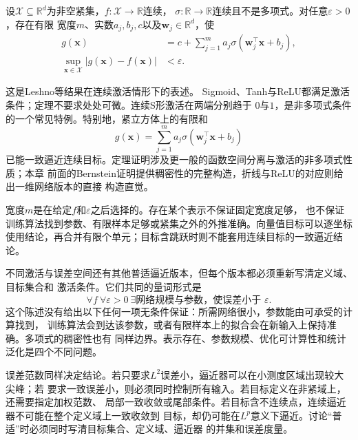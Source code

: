 \begin{theorem}[单隐藏层的通用逼近]
\label{thm:functional-universal-approximation}
设$\mathcal X\subseteq\mathbb R^d$为非空紧集，$f:\mathcal X\to\mathbb R$连续，
$\sigma:\mathbb R\to\mathbb R$连续且不是多项式。对任意$\varepsilon>0$，存在有限
宽度$m$、实数$a_j,b_j,c$以及$\bm w_j\in\mathbb R^d$，使
\begin{equation}
 \begin{aligned}
 g(\bm x)&=c+\sum_{j=1}^m a_j\sigma(\bm w_j^{\top}\bm x+b_j),\\
 \sup_{\bm x\in\mathcal X}|g(\bm x)-f(\bm x)|&<\varepsilon.
 \end{aligned}
 \label{eq:functional-universal-approximation}
\end{equation}
\end{theorem}

这是Leshno等结果在连续激活情形下的表述。
Sigmoid、Tanh与ReLU都满足激活条件；定理不要求处处可微。连续S形激活在两端分别趋于
$0$与$1$，是非多项式条件的一个常见特例。特别地，紧立方体上的有限和
\begin{equation}
 g(\bm x)=\sum_{j=1}^m a_j\sigma(\bm w_j^{\top}\bm x+b_j)
 \label{eq:functional-sigmoidal-network}
\end{equation}
已能一致逼近连续目标。定理证明涉及更一般的函数空间分离与激活的非多项式性质；本章
前面的Bernstein证明提供稠密性的完整构造，折线与ReLU的对应则给出一维网络版本的直接
构造直觉。

宽度$m$是在给定$f$和$\varepsilon$之后选择的。存在某个表示不保证固定宽度足够，
也不保证训练算法找到参数、有限样本足够或紧集之外的外推准确。向量值目标可以逐坐标
使用结论，再合并有限个单元；目标含跳跃时则不能套用连续目标的一致逼近结论。

不同激活与误差空间还有其他普适逼近版本，但每个版本都必须重新写清定义域、目标集合和
激活条件。它们共同的量词形式是
\[
  \forall f\ \forall\varepsilon>0\
  \exists\text{网络规模与参数，使误差小于 }\varepsilon.
\]
这个陈述没有给出以下任何一项无条件保证：所需网络很小，参数能由可承受的计算找到，
训练算法会到达该参数，或者有限样本上的拟合会在新输入上保持准确。多项式的稠密性也有
同样边界。表示存在、参数规模、优化可计算性和统计泛化是四个不同问题。

误差范数同样决定结论。若只要求$L^2$误差小，逼近器可以在小测度区域出现较大尖峰；若
要求一致误差小，则必须同时控制所有输入。若目标定义在非紧域上，还需要指定加权范数、
局部一致收敛或尾部条件。若目标含不连续点，连续逼近器不可能在整个定义域上一致收敛到
目标，却仍可能在$L^p$意义下逼近。讨论“普适”时必须同时写清目标集合、定义域、逼近器
的并集和误差度量。

